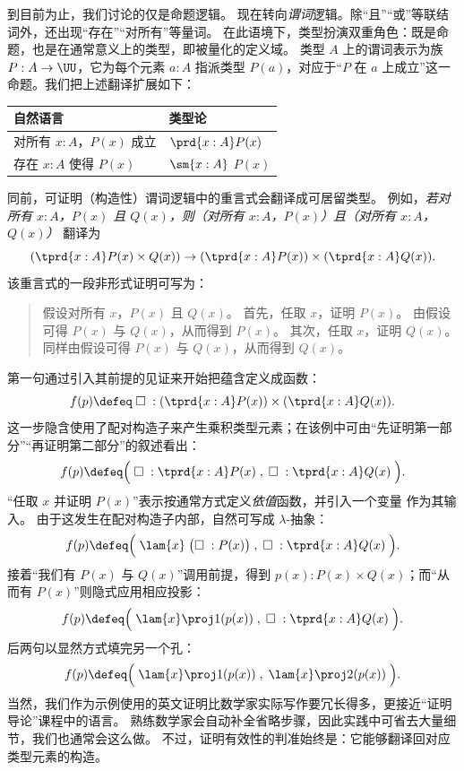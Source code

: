 到目前为止，我们讨论的仅是命题逻辑。
%
%
%
%
%
现在转向\emph{谓词}逻辑。除“且”“或”等联结词外，还出现“存在”“对所有”等量词。
在此语境下，类型扮演双重角色：既是命题，也是在通常意义上的类型，即被量化的定义域。
类型 $A$ 上的谓词表示为族 $P : A \to \UU$，它为每个元素 $a : A$ 指派类型 $P(a)$，对应于“$P$ 在 $a$ 上成立”这一命题。我们把上述翻译扩展如下：
\begin{center}
  \medskip
  \begin{tabular}{ll}
    \toprule
    自然语言 & 类型论\\
    \midrule
    对所有 $x:A$，$P(x)$ 成立 & $\prd{x:A} P(x)$ \\
    存在 $x:A$ 使得 $P(x)$ & $\sm{x:A}$ $P(x)$ \\
    \bottomrule
  \end{tabular}
  \medskip
\end{center}
同前，可证明（构造性）谓词逻辑中的重言式会翻译成可居留类型。
例如，\emph{若对所有 $x:A$，$P(x)$ 且 $Q(x)$，则（对所有 $x:A$，$P(x)$）且（对所有 $x:A$，$Q(x)$）} 翻译为
\[ (\tprd{x:A} P(x) \times Q(x)) \to (\tprd{x:A} P(x)) \times (\tprd{x:A} Q(x)). \]
该重言式的一段非形式证明可写为：
\begin{quote}
  假设对所有 $x$，$P(x)$ 且 $Q(x)$。
  首先，任取 $x$，证明 $P(x)$。
  由假设可得 $P(x)$ 与 $Q(x)$，从而得到 $P(x)$。
  其次，任取 $x$，证明 $Q(x)$。
  同样由假设可得 $P(x)$ 与 $Q(x)$，从而得到 $Q(x)$。
\end{quote}
第一句通过引入其前提的见证来开始把蕴含定义成函数：
\[ f(p) \defeq \;\Box\; : (\tprd{x:A} P(x)) \times (\tprd{x:A} Q(x)). \]
这一步隐含使用了配对构造子来产生乘积类型元素；在该例中可由“先证明第一部分”“再证明第二部分”的叙述看出：
\[ f(p) \defeq \Big( \;\Box\; : \tprd{x:A} P(x) \;,\; \Box\; : \tprd{x:A}Q(x) \;\Big). \]
“任取 $x$ 并证明 $P(x)$”表示按通常方式定义\emph{依值}函数，并引入一个变量
%
作为其输入。
由于这发生在配对构造子内部，自然可写成 $\lambda$-抽象：
\[ f(p) \defeq \Big( \; \lam{x} \;\big(\Box\; : P(x)\big) \;,\; \Box\; : \tprd{x:A}Q(x) \;\Big). \]
接着“我们有 $P(x)$ 与 $Q(x)$”调用前提，得到 $p(x) : P(x)\times Q(x)$；而“从而有 $P(x)$”则隐式应用相应投影：
\[ f(p) \defeq \Big( \; \lam{x} \proj1(p(x))  \;,\; \Box\; : \tprd{x:A}Q(x) \;\Big). \]
后两句以显然方式填完另一个孔：
\[ f(p) \defeq \Big( \; \lam{x} \proj1(p(x))  \;,\; \lam{x} \proj2(p(x)) \; \Big). \]
当然，我们作为示例使用的英文证明比数学家实际写作要冗长得多，更接近“证明导论”课程中的语言。
熟练数学家会自动补全省略步骤，因此实践中可省去大量细节，我们也通常会这么做。
不过，证明有效性的判准始终是：它能够翻译回对应类型元素的构造。

